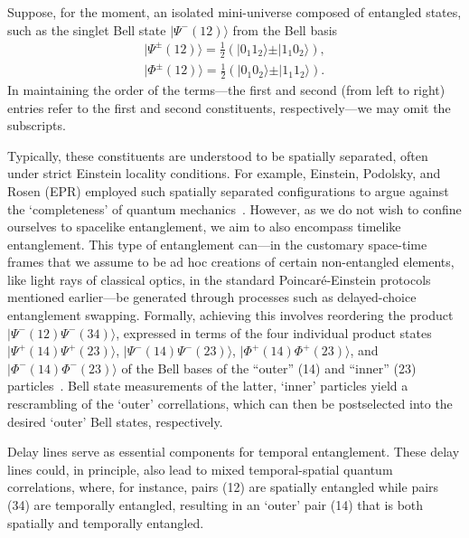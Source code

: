 \documentclass[%
  reprint,
 showpacs,
 showkeys,
 preprintnumbers,
 nofootinbib,
 amsmath,amssymb,
 aps,
 pra,
  longbibliography,
 ]{revtex4-2}
\begin{document}
Suppose, for the moment, an isolated mini-universe composed
of entangled states, such as the singlet Bell state $\vert \Psi^-(12) \rangle$ from the Bell basis
\begin{equation}
\begin{split}
\vert \Psi^\pm (12) \rangle
=
\frac{1}{2}\left(
\vert 0_1 1_2 \rangle
\pm
\vert 1_1 0_2 \rangle
\right)
,\\
\vert \Phi^\pm (12) \rangle
=
\frac{1}{2}\left(
\vert 0_1 0_2 \rangle
\pm
\vert 1_1 1_2 \rangle
\right)
.
\end{split}
\label{2023-st-EPRBstates}
\end{equation}
In maintaining the order of the terms---the first and second (from left to right) entries
refer to the first and second constituents, respectively---we may omit the subscripts.

Typically, these constituents are understood to be spatially separated, often under strict Einstein locality conditions.
For example, Einstein, Podolsky, and Rosen (EPR) employed such spatially separated configurations to argue against the `completeness' of
quantum mechanics~\cite{epr,Howard1985171}.
However, as we do not wish to confine ourselves to spacelike entanglement,
we aim to also encompass timelike entanglement. This type of entanglement can---in the customary space-time frames that
we assume to be ad hoc creations of certain non-entangled elements, like light rays of classical optics,
in the standard Poincar\'e-Einstein protocols mentioned earlier---be generated through processes such as delayed-choice entanglement swapping.
Formally, achieving this involves reordering the product $\vert \Psi^-(12) \Psi^-(34) \rangle$,
expressed in terms of the four individual product states
$\vert \Psi^+(14)   \Psi^+(23)  \rangle$,
$\vert \Psi^-(14)   \Psi^-(23)  \rangle$,
$\vert \Phi^+(14)   \Phi^+(23)  \rangle$, and
$\vert \Phi^-(14)   \Phi^-(23)  \rangle$
of the Bell bases of the ``outer'' (14) and ``inner'' (23)
particles~\cite{Zuk-1993-entanglementswapping,Megidish_2013,peres-DelayedChoiceEntanglementSwapping,svozil-2016-sampling}.
Bell state measurements of the latter, `inner' particles yield a rescrambling of the `outer'
correllations, which can then be postselected into the desired `outer'
Bell states, respectively.

Delay lines serve as essential components for temporal entanglement.
These delay lines could, in principle, also lead to mixed temporal-spatial quantum correlations, where,
for instance, pairs (12) are spatially entangled while pairs (34) are temporally entangled,
resulting in an `outer' pair (14) that is both spatially and temporally entangled.
\end{document}
